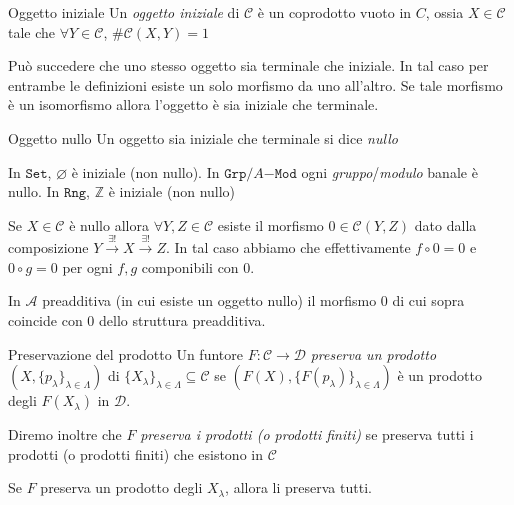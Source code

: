 \begin{definition}{Oggetto iniziale}
    Un \emph{oggetto iniziale} di \(\mathcal{C}\) è un coprodotto vuoto in \(C\), ossia \(X \in \mathcal{C}\) tale che
    \(\forall Y \in \mathcal{C}\), \(\# \mathcal{C}{(X, Y)} = 1\) 
\end{definition}

Può succedere che uno stesso oggetto sia terminale che iniziale. In tal caso per entrambe le definizioni esiste un solo morfismo da uno all'altro. Se tale morfismo è un isomorfismo
allora l'oggetto è sia iniziale che terminale.

\begin{definition}{Oggetto nullo}
    Un oggetto sia iniziale che terminale si dice \emph{nullo}
\end{definition}

\begin{example}{}
    In \(\mathtt{Set}\), \(\varnothing\) è iniziale (non nullo).
    In \(\mathtt{Grp}/A\mathtt{-Mod}\) ogni \emph{gruppo}/\emph{modulo} banale è
    nullo.
    In \(\mathtt{Rng}\), \(\mathbb{Z}\) è iniziale (non nullo)
\end{example}

    Se \(X \in \mathcal{C}\) è nullo allora \(\forall Y, Z \in \mathcal{C}\)
    esiste il morfismo \(0 \in \mathcal{C}{(Y, Z)}\) dato dalla composizione
    \(Y \overset{\exists !}{\to } X \overset{\exists !}{\to } Z\). In tal caso
    abbiamo che effettivamente \(f \circ 0 = 0\) e \(0 \circ g = 0\)  per ogni
    \(f, g\) componibili con \(0\).
\begin{example}{}
    In \(\mathcal{A}\) preadditiva (in cui esiste un oggetto nullo) il morfismo
    0 di cui sopra coincide con 0 dello struttura preadditiva.
\end{example}

\begin{definition}{Preservazione del prodotto}
    Un funtore \(F : \mathcal{C} \to \mathcal{D}\) \emph{preserva un prodotto}
    \({(X, \{p_\lambda\} _{\lambda \in \Lambda} )}\) di \(\{X_\lambda\}_{\lambda \in \Lambda} \subseteq \mathcal{C} \) se \({(F{(X)}, \{F{(p_\lambda)}\}_{\lambda \in \Lambda}  )}\) è un prodotto degli \(F{(X_{\lambda} )}\) in \(\mathcal{D}\).

    Diremo inoltre che \(F\) \emph{preserva i prodotti (o prodotti finiti)} se preserva
    tutti i prodotti (o prodotti finiti) che esistono in \(\mathcal{C}\) 
\end{definition}
\begin{remark}{}
    Se \(F\) preserva un prodotto degli \(X_\lambda\), allora li preserva tutti.
\end{remark}

